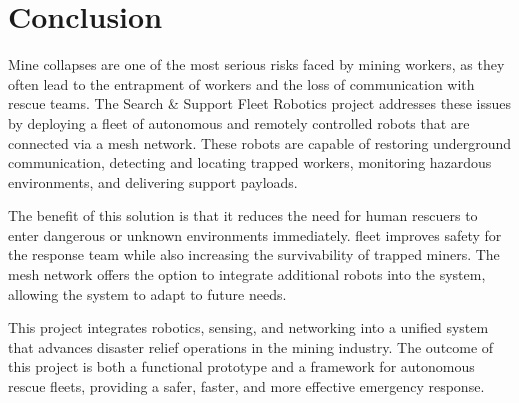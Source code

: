 \section{Conclusion}
\label{sec:conclusion}

Mine collapses are one of the most serious risks faced by mining workers, as they often lead to the entrapment of workers and the loss of communication with rescue teams. The Search \& Support Fleet Robotics project addresses these issues by deploying a fleet of autonomous and remotely controlled robots that are connected via a mesh network. These robots are capable of restoring underground communication, detecting and locating trapped workers, monitoring hazardous environments, and delivering support payloads.

The benefit of this solution is that it reduces the need for human rescuers to enter dangerous or unknown environments immediately. \gls{fleet} improves safety for the response team while also increasing the survivability of trapped miners. The mesh network offers the option to integrate additional robots into the system, allowing the system to adapt to future needs.

This project integrates robotics, sensing, and networking into a unified system that advances disaster relief operations in the mining industry. The outcome of this project is both a functional prototype and a framework for autonomous rescue fleets, providing a safer, faster, and more effective emergency response.
